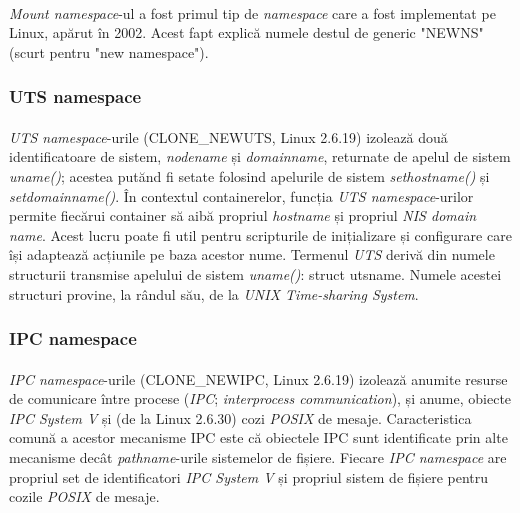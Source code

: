             \paragraph{} \textit{Mount namespace}-ul a fost primul tip de \textit{namespace} care a fost implementat pe Linux, apărut în 2002. Acest fapt explică numele destul de generic "NEWNS" (scurt pentru "new namespace"). \cite{ns:lwn}

        \subsubsection{UTS namespace}
            \paragraph{} \textit{UTS namespace}-urile (CLONE\_NEWUTS, Linux 2.6.19) izolează două identificatoare de sistem, \textit{nodename} și \textit{domainname}, returnate de apelul de sistem \textit{uname()}; acestea putănd fi setate folosind apelurile de sistem \textit{sethostname()} și \textit{setdomainname()}. În contextul containerelor, funcția \textit{UTS namespace}-urilor permite fiecărui container să aibă propriul \textit{hostname} și propriul \textit{NIS domain name}. Acest lucru poate fi util pentru scripturile de inițializare și configurare care își adaptează acțiunile pe baza acestor nume. Termenul \textit{UTS} derivă din numele structurii transmise apelului de sistem \textit{uname()}: struct utsname. Numele acestei structuri provine, la rândul său, de la \textit{UNIX Time-sharing System}. \cite{ns:lwn}

        \subsubsection{IPC namespace}
            \paragraph{} \textit{IPC namespace}-urile (CLONE\_NEWIPC, Linux 2.6.19) izolează anumite resurse de comunicare între procese (\textit{IPC}; \textit{interprocess communication}), și anume, obiecte \textit{IPC System V} și (de la Linux 2.6.30) cozi \textit{POSIX} de mesaje. Caracteristica comună a acestor mecanisme IPC este că obiectele IPC sunt identificate prin alte mecanisme decât \textit{pathname}-urile sistemelor de fișiere. Fiecare \textit{IPC namespace} are propriul set de identificatori \textit{IPC System V} și propriul sistem de fișiere pentru cozile \textit{POSIX} de mesaje. \cite{ns:lwn}

